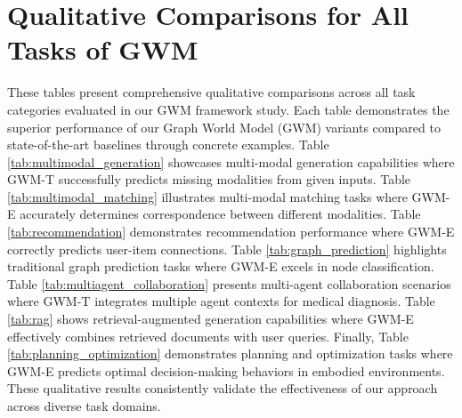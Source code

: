 \section{Qualitative Comparisons for All Tasks of GWM} \label{app:Qualitative Comparisons}


These tables present comprehensive qualitative comparisons across all task categories evaluated in our GWM framework study. Each table demonstrates the superior performance of our Graph World Model (GWM) variants compared to state-of-the-art baselines through concrete examples. Table \ref{tab:multimodal_generation} showcases multi-modal generation capabilities where GWM-T successfully predicts missing modalities from given inputs. Table \ref{tab:multimodal_matching} illustrates multi-modal matching tasks where GWM-E accurately determines correspondence between different modalities. Table \ref{tab:recommendation} demonstrates recommendation performance where GWM-E correctly predicts user-item connections. Table \ref{tab:graph_prediction} highlights traditional graph prediction tasks where GWM-E excels in node classification. Table \ref{tab:multiagent_collaboration} presents multi-agent collaboration scenarios where GWM-T integrates multiple agent contexts for medical diagnosis. Table \ref{tab:rag} shows retrieval-augmented generation capabilities where GWM-E effectively combines retrieved documents with user queries. Finally, Table \ref{tab:planning_optimization} demonstrates planning and optimization tasks where GWM-E predicts optimal decision-making behaviors in embodied environments. These qualitative results consistently validate the effectiveness of our approach across diverse task domains.

